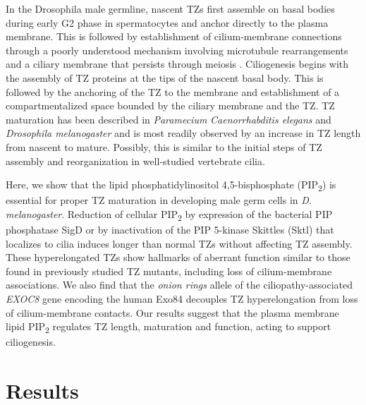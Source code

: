 \documentclass[12pt, twoside, letterpaper]{article}
\newcommand{\PIP}{PIP\textsubscript{2}}
\begin{document}
In the Drosophila male germline, nascent TZs first assemble on basal bodies
during early G2 phase in spermatocytes and anchor directly to the plasma membrane.
This is followed by establishment of cilium-membrane connections
through a poorly understood mechanism
involving microtubule rearrangements \citep{gottardo2013cilium} and a
ciliary membrane that persists through meiosis \citep{riparbelli2012assembly}.
Ciliogenesis begins with the assembly of TZ proteins at the tips of
the nascent basal body.
This is followed by the anchoring of the TZ to the membrane and
establishment of a compartmentalized space bounded by the ciliary membrane
and the TZ.
TZ maturation has been described in
\textit{Paramecium} \citep{aubusson2015transition}
\textit{Caenorrhabditis elegans} \citep{serwas2017centrioles} and
\textit{Drosophila melanogaster} \citep{gottardo2013cilium}
and is most readily observed by an increase in TZ length from nascent to mature.
Possibly, this is similar to the initial steps of TZ assembly and reorganization
in well-studied vertebrate cilia.

Here, we show that the lipid phosphatidylinositol 4,5-bisphosphate (\PIP{})
is essential for proper TZ maturation in developing male germ cells in \textit{D. melanogaster}.
Reduction of cellular \PIP{} by expression of the bacterial PIP phosphatase SigD
or by inactivation of the PIP 5-kinase Skittles (Sktl) that localizes to cilia
induces longer than normal TZs without affecting TZ assembly.
These hyperelongated TZs show hallmarks of aberrant function similar to those
found in previously studied TZ mutants, including loss of cilium-membrane associations.
We also find that the \textit{onion rings} allele of the
ciliopathy-associated \textit{EXOC8} gene encoding the human Exo84
decouples TZ hyperelongation from loss of cilium-membrane contacts.
Our results suggest that the plasma membrane lipid \PIP{} regulates TZ length,
maturation and function, acting to support ciliogenesis.


\section{Results}
\end{document}
